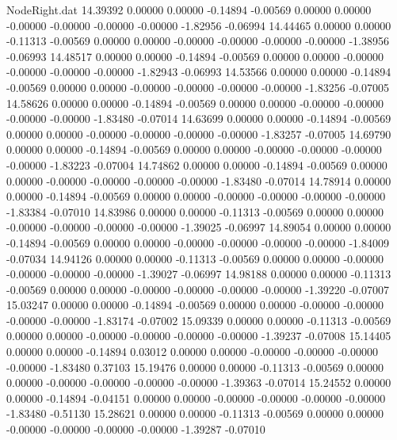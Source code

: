\begin{filecontents}{NodeRight.dat}
  14.39392    0.00000    0.00000    -0.14894   -0.00569    0.00000    0.00000   -0.00000   -0.00000   -0.00000   -0.00000   -1.82956   -0.06994
  14.44465    0.00000    0.00000    -0.11313   -0.00569    0.00000    0.00000   -0.00000   -0.00000   -0.00000   -0.00000   -1.38956   -0.06993
  14.48517    0.00000    0.00000    -0.14894   -0.00569    0.00000    0.00000   -0.00000   -0.00000   -0.00000   -0.00000   -1.82943   -0.06993
  14.53566    0.00000    0.00000    -0.14894   -0.00569    0.00000    0.00000   -0.00000   -0.00000   -0.00000   -0.00000   -1.83256   -0.07005
  14.58626    0.00000    0.00000    -0.14894   -0.00569    0.00000    0.00000   -0.00000   -0.00000   -0.00000   -0.00000   -1.83480   -0.07014
  14.63699    0.00000    0.00000    -0.14894   -0.00569    0.00000    0.00000   -0.00000   -0.00000   -0.00000   -0.00000   -1.83257   -0.07005
  14.69790    0.00000    0.00000    -0.14894   -0.00569    0.00000    0.00000   -0.00000   -0.00000   -0.00000   -0.00000   -1.83223   -0.07004
  14.74862    0.00000    0.00000    -0.14894   -0.00569    0.00000    0.00000   -0.00000   -0.00000   -0.00000   -0.00000   -1.83480   -0.07014
  14.78914    0.00000    0.00000    -0.14894   -0.00569    0.00000    0.00000   -0.00000   -0.00000   -0.00000   -0.00000   -1.83384   -0.07010
  14.83986    0.00000    0.00000    -0.11313   -0.00569    0.00000    0.00000   -0.00000   -0.00000   -0.00000   -0.00000   -1.39025   -0.06997
  14.89054    0.00000    0.00000    -0.14894   -0.00569    0.00000    0.00000   -0.00000   -0.00000   -0.00000   -0.00000   -1.84009   -0.07034
  14.94126    0.00000    0.00000    -0.11313   -0.00569    0.00000    0.00000   -0.00000   -0.00000   -0.00000   -0.00000   -1.39027   -0.06997
  14.98188    0.00000    0.00000    -0.11313   -0.00569    0.00000    0.00000   -0.00000   -0.00000   -0.00000   -0.00000   -1.39220   -0.07007
  15.03247    0.00000    0.00000    -0.14894   -0.00569    0.00000    0.00000   -0.00000   -0.00000   -0.00000   -0.00000   -1.83174   -0.07002
  15.09339    0.00000    0.00000    -0.11313   -0.00569    0.00000    0.00000   -0.00000   -0.00000   -0.00000   -0.00000   -1.39237   -0.07008
  15.14405    0.00000    0.00000    -0.14894    0.03012    0.00000    0.00000   -0.00000   -0.00000   -0.00000   -0.00000   -1.83480    0.37103
  15.19476    0.00000    0.00000    -0.11313   -0.00569    0.00000    0.00000   -0.00000   -0.00000   -0.00000   -0.00000   -1.39363   -0.07014
  15.24552    0.00000    0.00000    -0.14894   -0.04151    0.00000    0.00000   -0.00000   -0.00000   -0.00000   -0.00000   -1.83480   -0.51130
  15.28621    0.00000    0.00000    -0.11313   -0.00569    0.00000    0.00000   -0.00000   -0.00000   -0.00000   -0.00000   -1.39287   -0.07010

\end{filecontents}
